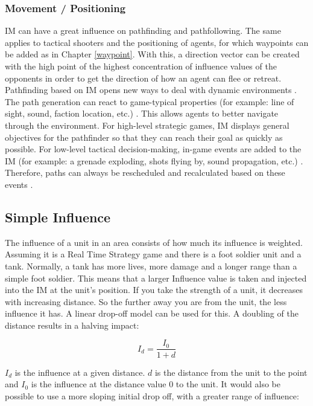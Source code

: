 \documentclass[]{report}
\begin{document}
	\subsubsection{Movement / Positioning}
	\ac{IM} can have a great influence on pathfinding and pathfollowing. The same applies to tactical shooters and the positioning of agents, for which waypoints can be added as in Chapter  \ref{waypoint}.
	With this, a direction vector can be created with the high point of the highest concentration of influence values of the opponents in order to get the direction of how an agent can flee or retreat. \newline \newline
	Pathfinding based on \ac{IM} opens new ways to deal with dynamic environments \citep{imPathfinding}. The path generation can react to game-typical properties (for example: line of sight, sound, faction location, etc.) \citep{imPathfinding}. This allows agents to better navigate through the environment. For high-level strategic games, IM displays general objectives for the pathfinder so that they can reach their goal as quickly as possible. For low-level tactical decision-making, in-game events are added to the \ac{IM} (for example: a grenade exploding, shots flying by, sound propagation, etc.) \citep{imPathfinding}. Therefore, paths can always be rescheduled and recalculated based on these events \citep{imPathfinding}. 
	
	
	\subsection{Simple Influence} \label{ssec:num2}
	The influence of a unit in an area consists of how much its influence is weighted. Assuming it is a Real Time Strategy game and there is a foot soldier unit and a tank. Normally, a tank has more lives, more damage and a longer range than a simple foot soldier. This means that a larger Influence value is taken and injected into the \ac{IM} at the unit's position. If you take the strength of a unit, it decreases with increasing distance. So the further away you are from the unit, the less influence it has. A linear drop-off model can be used for this. A doubling of the distance results in a halving impact:
	
	\begin{equation}
		I_{d} = \frac{I_{0}}{1 + d}
	\end{equation}

	
	$I_{d}$ is the influence at a given distance. $d$ is the distance from the unit to the point and $I_{0}$ is the influence at the distance value 0 to the unit. It would also be possible to use a more sloping initial drop off, with a greater range of influence:
	
\end{document}
